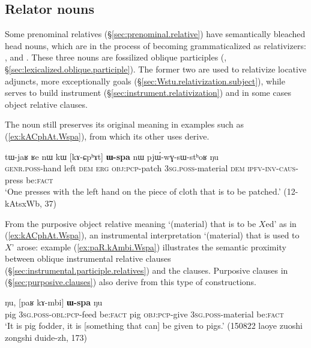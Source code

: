 \subsection{Relator nouns} \label{sec:Wspa.relative}  
Some prenominal relatives (§\ref{sec:prenominal.relative}) have semantically bleached head nouns, which are in the process of becoming grammaticalized as relativizers:  ,   and . These three nouns are fossilized oblique participles (, §\ref{sec:lexicalized.oblique.participle}). The former two are used to relativize locative adjuncts, more exceptionally goals (§\ref{sec:Wstu.relativization.subject}), while   serves to build  instrument (§\ref{sec:instrument.relativization}) and in some cases object relative clauses.
 
The noun  still preserves its original meaning in examples such as (\ref{ex:kACphAt.Wspa}), from which its other uses derive.
 
\begin{exe}
\ex \label{ex:kACphAt.Wspa} 
\gll tɯ-jaʁ ʁe nɯ kɯ [kɤ-ɕpʰɤt] \textbf{ɯ-spa} nɯ pjɯ́-wɣ-sɯ-stʰoʁ ŋu \\
\textsc{genr}.\textsc{poss}-hand left \textsc{dem} \textsc{erg} \textsc{obj}:\textsc{pcp}-patch \textsc{3sg}.\textsc{poss}-material \textsc{dem} \textsc{ipfv}-\textsc{inv}-\textsc{caus}-press be:\textsc{fact} \\
\glt `One presses with the left hand on the piece of cloth that is to be patched.' (12-kAtsxWb, 37)
\end{exe}

From the purposive object relative meaning `(material) that is to be $X$ed' as in (\ref{ex:kACphAt.Wspa}), an instrumental interpretation `(material) that is used to $X$' arose: example (\ref{ex:paR.kAmbi.Wspa}) illustrates the semantic proximity between oblique instrumental relative clauses (§\ref{sec:instrumental.participle.relatives}) and the  clauses. Purposive clauses in  (§\ref{sec:purposive.clauses}) also derive from this type of constructions.

\begin{exe}
\ex \label{ex:paR.kAmbi.Wspa} 
 ŋu, [paʁ kɤ-mbi] \textbf{ɯ-spa} ŋu \\
pig \textsc{3sg}.\textsc{poss}-\textsc{obl}:\textsc{pcp}-feed be:\textsc{fact} pig \textsc{obj}:\textsc{pcp}-give \textsc{3sg}.\textsc{poss}-material be:\textsc{fact} \\
\glt `It is pig fodder, it is [something that can] be given to pigs.' (150822 laoye zuoshi zongshi duide-zh, 173)
\end{exe}  

